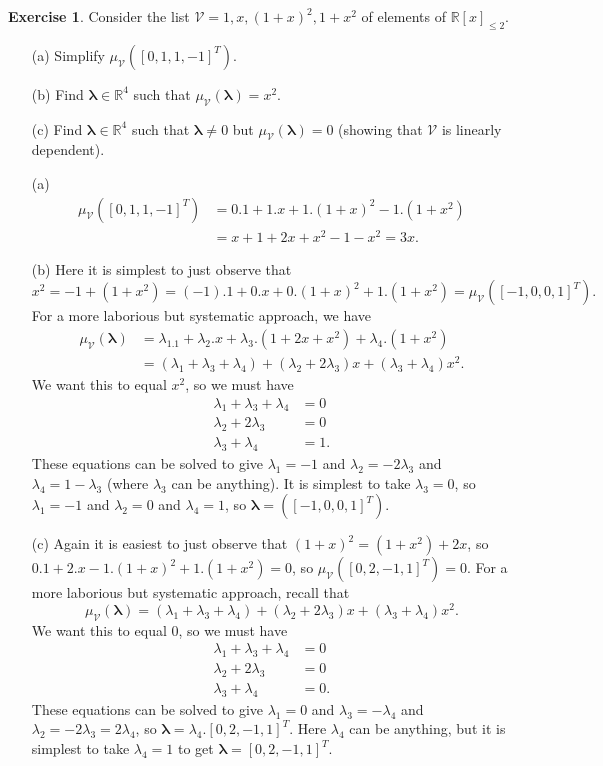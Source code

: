 \documentclass{amsart}
\newcommand{\R}         {{\mathbb{R}}}
\newcommand{\lm}        {\lambda}
\newcommand{\vlm}       {\mathbf{\lambda}}
\newcommand{\CV}        {{\mathcal{V}}}
\renewcommand{\:}       {\colon}
\theoremstyle{definition}
\newtheorem{exercise}{Exercise}[section]
\renewenvironment{solution}{\SolutionAtEnd}{\endSolutionAtEnd}
\begin{document}
\begin{exercise}
 Consider the list $\CV=1,x,(1+x)^2,1+x^2$ of elements of
 $\R[x]_{\leq 2}$.
 \begin{itemize}\renewcommand{\itemsep}{1ex}
  \item[(a)] Simplify $\mu_{\CV}([0,1,1,-1]^T)$.
  \item[(b)] Find $\vlm\in\R^4$ such that
   $\mu_\CV(\vlm)=x^2$.
  \item[(c)] Find $\vlm\in\R^4$ such that $\vlm\neq 0$ but
   $\mu_\CV(\vlm)=0$ (showing that $\CV$ is linearly
   dependent).
 \end{itemize}
\end{exercise}
\begin{solution}
 \begin{itemize}
  \item[(a)] 
   \begin{align*}
    \mu_\CV([0,1,1,-1]^T)
     &= 0.1 + 1.x + 1.(1+x)^2 - 1.(1+x^2) \\
     &= x + 1 + 2x + x^2 - 1 - x^2 = 3x.
   \end{align*}
  \item[(b)] Here it is simplest to just observe that 
   \[ x^2 =
       -1 + (1+x^2) = (-1). 1 + 0.x + 0.(1+x)^2 + 1.(1+x^2) = 
       \mu_\CV([-1,0,0,1]^T).
   \]
   For a more laborious but systematic approach, we have
   \begin{align*}
    \mu_\CV(\vlm)
     &= \lm_1.1 + \lm_2.x + \lm_3.(1+2x+x^2) + \lm_4.(1+x^2) \\
     &= (\lm_1+\lm_3+\lm_4) + (\lm_2+2\lm_3)x + (\lm_3+\lm_4)x^2.
   \end{align*}
   We want this to equal $x^2$, so we must have
   \begin{align*}
    \lm_1 + \lm_3 + \lm_4 &= 0 \\
    \lm_2 + 2\lm_3 &= 0 \\
    \lm_3 + \lm_4 &= 1.
   \end{align*}
   These equations can be solved to give $\lm_1=-1$ and
   $\lm_2=-2\lm_3$ and $\lm_4=1-\lm_3$ (where $\lm_3$ can be
   anything).  It is simplest to take $\lm_3=0$, so
   $\lm_1=-1$ and $\lm_2=0$ and $\lm_4=1$, so
   $\vlm=([-1,0,0,1]^T)$.  
  \item[(c)] Again it is easiest to just observe that
   $(1+x)^2=(1+x^2)+2x$, so
   $0.1 + 2.x - 1.(1+x)^2 + 1.(1+x^2)=0$, so
   $\mu_\CV([0,2,-1,1]^T)=0$.  
   For a more laborious but systematic approach, recall that
   \[ \mu_\CV(\vlm) =
      (\lm_1+\lm_3+\lm_4) + (\lm_2+2\lm_3)x + (\lm_3+\lm_4)x^2.
   \]
   We want this to equal $0$, so we must have
   \begin{align*}
    \lm_1 + \lm_3 + \lm_4 &= 0 \\
    \lm_2 + 2\lm_3 &= 0 \\
    \lm_3 + \lm_4 &= 0.
   \end{align*}
   These equations can be solved to give $\lm_1=0$ and
   $\lm_3=-\lm_4$ and $\lm_2=-2\lm_3=2\lm_4$, so
   $\vlm=\lm_4.[0,2,-1,1]^T$.  Here $\lm_4$ can be anything,
   but it is simplest to take $\lm_4=1$ to get
   $\vlm=[0,2,-1,1]^T$. 
 \end{itemize}
\end{solution}
\end{document}
